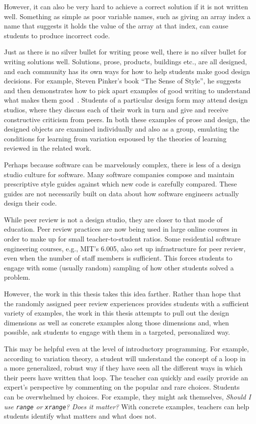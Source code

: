 However, it can also be very hard to achieve a correct solution if it is not written well. Something as simple as poor variable names, such as giving an array index a name that suggests it holds the value of the array at that index, can cause students to produce incorrect code.

Just as there is no silver bullet for writing prose well, there is no silver bullet for writing solutions well. Solutions, prose, products, buildings etc., are all designed, and each community has its own ways for how to help students make good design decisions. For example, Steven Pinker's book ``The Sense of Style'', he suggests and then demonstrates how to pick apart examples of good writing to understand what makes them good~\cite{pinkersense}. Students of a particular design form may attend design studios, where they discuss each of their work in turn and give and receive constructive criticism from peers. In both these examples of prose and design, the designed objects are examined individually and also as a group, emulating the conditions for learning from variation espoused by the theories of learning reviewed in the related work. 

Perhaps because software can be marvelously complex, there is less of a design studio culture for software. Many software companies compose and maintain prescriptive style guides against which new code is carefully compared. These guides are not necessarily built on data about how software engineers actually design their code. 

While peer review is not a design studio, they are closer to that mode of education. Peer review practices are now being used in large online courses in order to make up for small teacher-to-student ratios. Some residential software engineering courses, e.g., MIT's 6.005, also set up infrastructure for peer review, even when the number of staff members is sufficient. This forces students to engage with some (usually random) sampling of how other students solved a problem. 

However, the work in this thesis takes this idea farther. Rather than hope that the randomly assigned peer review experiences provides students with a sufficient variety of examples, the work in this thesis attempts to pull out the design dimensions as well as concrete examples along those dimensions and, when possible, ask students to engage with them in a targeted, personalized way. 

This may be helpful even at the level of introductory programming. For example, according to variation theory, a student will understand the concept of a loop in a more generalized, robust way if they have seen all the different ways in which their peers have written that loop. The teacher can quickly and easily provide an expert's perspective by commenting on the popular and rare choices. Students can be overwhelmed by choices. For example, they might ask themselves, {\it Should I use \texttt{range} or \texttt{xrange}? Does it matter?} With concrete examples, teachers can help students identify what matters and what does not. 

